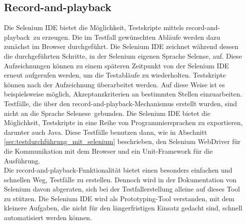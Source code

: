 \subsection{Record-and-playback}
\label{sec:recorde_and_playback}
Die Selenium IDE bietet die Möglichkeit, Testskripte mittels \grq record-and-playback\grq\ zu erzeugen.
Die im Testfall gewünschten Abläufe werden dazu zunächst im Browser durchgeführt.
Die Selenium IDE zeichnet während dessen die durchgeführten Schritte, in der Selenium eigenen Sprache \grq Selense\grq, auf. Diese Aufzeichnungen können zu einem späteren Zeitpunkt von der Selenium IDE erneut aufgerufen werden, um die Testabläufe zu wiederholten.
Testskripte können nach der Aufzeichnung überarbeitet werden. Auf diese Weise ist es beispielsweise möglich, Akzeptanzkriterien an bestimmten Stellen einzuarbeiten.\\
Testfälle, die über den \grq record-and-playback\grq -Mechanismus erstellt wurden, sind nicht an die Sprache \grq Selenese\grq\ gebunden. Die Selenium IDE bietet die Möglichkeit, Testskripte in eine Reihe von Programmiersprachen zu exportieren, darunter auch Java.
Diese Testfälle benutzen dann, wie in Abschnitt \ref{sec:testdurchführung_mit_selenium} beschrieben, den Selenium WebDriver für die Kommunikation mit dem Browser und ein Unit-Framework für die Ausführung.\\
Die \grq record-and-playback\grq -Funktionalität bietet einen besonders einfachen und schnellen Weg, Testfälle zu erstellen. Dennoch wird in der Dokumentation von Selenium \cite{selenium_selenium_2015-1} davon abgeraten, sich bei der Testfallerstellung alleine auf dieses Tool zu stützen. Die Selenium IDE wird als Prototyping-Tool verstanden, mit dem kleinere Aufgaben, die nicht für den längerfristigen Einsatz gedacht sind, schnell automatisiert werden können.

